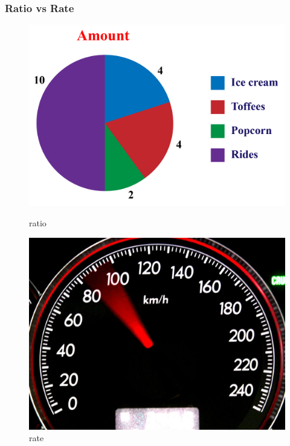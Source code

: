 \documentclass{beamer}
\begin{document}
\begin{frame}
    \frametitle{Ratio vs Rate}
    \begin{figure}[h]    
        \begin{minipage}[b]{0.5\textwidth}
        \centering
        \includegraphics[scale=0.2]{ratio.png}
        \caption{ratio}
    \end{minipage}
    \begin{minipage}[b]{0.4\textwidth}
        \centering
        \includegraphics[scale=0.5]{rate.jpeg}
        \caption{rate}
    \end{minipage}
\end{figure}
\end{frame}
\end{document}
